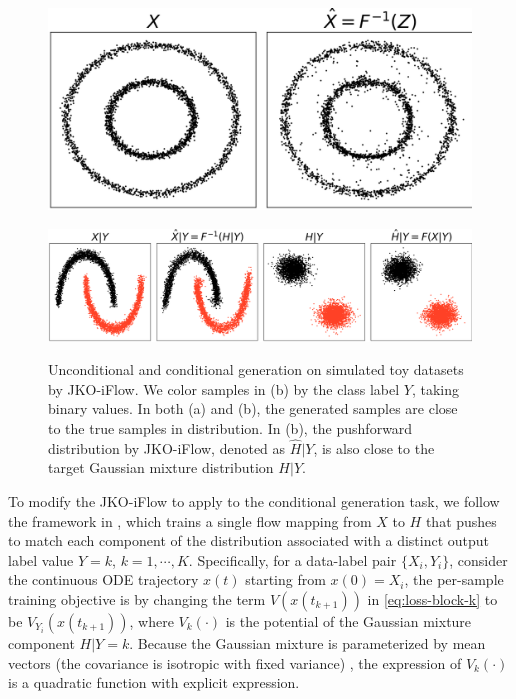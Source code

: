 \documentclass{article}
\theoremstyle{remark}
\theoremstyle{plain}
\newcommand{\JKO}{JKO-iFlow}
\begin{document}
{%
\begin{figure}[!t]
\vspace{0.15in}
    \begin{minipage}{0.35\textwidth}
        \centering
        \includegraphics[width=\textwidth]{_true_vs_gen.png}
        \label{circle}
    \end{minipage}
    \hspace{0.05in}
    \begin{minipage}{0.63\textwidth}
        \centering
        \includegraphics[width=\textwidth]{two_moon_true_vs_gen.png}
        \label{fig_cond_gen_toy}
    \end{minipage}
    \caption{
    Unconditional and conditional generation on simulated toy datasets by \JKO{}. We color samples in (b) by the class label $Y$, taking binary values. 
    In both (a) and (b), the generated samples are close to the true samples in distribution. 
    In (b), the pushforward distribution by \JKO{}, denoted as $\hat{H}|Y$, is also close to the target Gaussian mixture distribution $H|Y$.
    }
    \label{fig_2d_full_data_append}
\end{figure}


To modify the \JKO{} to apply to the conditional generation task, 
we follow the framework in \cite{xu2022invertible},
which trains a single flow mapping from $X$ to $H$ that pushes to match each component of the distribution associated with a distinct output label value $Y=k$, $k=1,\cdots, K$. 
Specifically, for a data-label pair $\{X_i, Y_i\}$, consider the continuous ODE trajectory $x(t)$ starting from $x(0) = X_i$, the per-sample training objective is by changing the term $V( x(t_{k+1}))$ in \eqref{eq:loss-block-k} to be $V_{Y_i}( x(t_{k+1}) )$, where $V_{k}(\cdot)$ is the potential of the Gaussian mixture component $H| Y=k$. Because the Gaussian mixture is parameterized by mean vectors (the covariance is isotropic with fixed variance) \citep{xu2022invertible}, the expression of $V_{k}(\cdot)$ is a quadratic function with explicit expression. 



}
\end{document}
